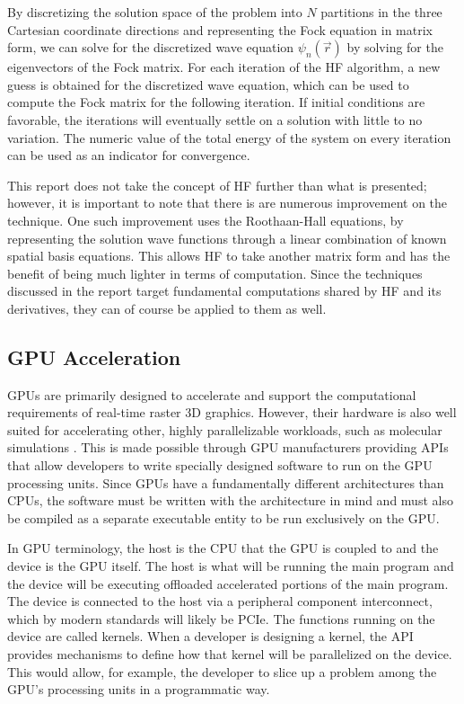 \documentclass[conference, twoside]{IEEEtran}
\begin{document}
By discretizing the solution space of the problem into $N$ partitions in the three Cartesian coordinate directions and representing the Fock equation in matrix form, we can solve for the discretized wave equation $\psi_n(\vec{r})$ by solving for the eigenvectors of the Fock matrix. For each iteration of the HF algorithm, a new guess is obtained for the discretized wave equation, which can be used to compute the Fock matrix for the following iteration. If initial conditions are favorable, the iterations will eventually settle on a solution with little to no variation. The numeric value of the total energy of the system on every iteration can be used as an indicator for convergence.

This report does not take the concept of HF further than what is presented; however, it is important to note that there is are numerous improvement on the technique. One such improvement uses the Roothaan-Hall equations, by representing the solution wave functions through a linear combination of known spatial basis equations. This allows HF to take another matrix form and has the benefit of being much lighter in terms of computation. Since the techniques discussed in the report target fundamental computations shared by HF and its derivatives, they can of course be applied to them as well.

\subsection{GPU Acceleration} %

GPUs are primarily designed to accelerate and support the computational requirements of real-time raster 3D graphics. However, their hardware is also well suited for accelerating other, highly parallelizable workloads, such as molecular simulations \cite{electronic-structure-calculations-on-gpus}. This is made possible through GPU manufacturers providing APIs that allow developers to write specially designed software to run on the GPU processing units. Since GPUs have a fundamentally different architectures than CPUs, the software must be written with the architecture in mind and must also be compiled as a separate executable entity to be run exclusively on the GPU.

In GPU terminology, the host is the CPU that the GPU is coupled to and the device is the GPU itself. The host is what will be running the main program and the device will be executing offloaded accelerated portions of the main program. The device is connected to the host via a peripheral component interconnect, which by modern standards will likely be PCIe. The functions running on the device are called kernels. When a developer is designing a kernel, the API provides mechanisms to define how that kernel will be parallelized on the device. This would allow, for example, the developer to slice up a problem among the GPU's processing units in a programmatic way.
\end{document}
